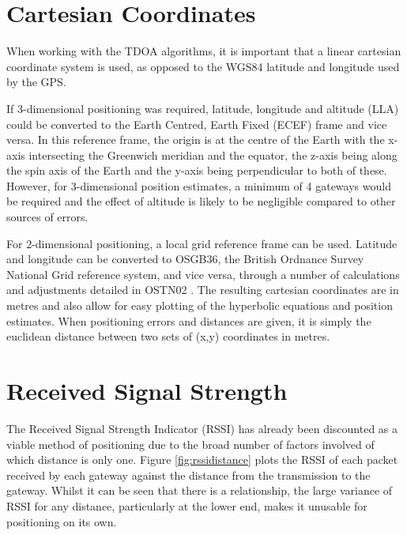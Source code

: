 \documentclass[a4paper]{report}
\begin{document}
  \section{Cartesian Coordinates}
    When working with the TDOA algorithms, it is important that a linear cartesian coordinate system is used, as opposed to the WGS84 latitude and longitude used by the GPS.

    If 3-dimensional positioning was required, latitude, longitude and altitude (LLA) could be converted to the Earth Centred, Earth Fixed (ECEF) frame and vice versa. In this reference frame, the origin is at the centre of the Earth with the x-axis intersecting the Greenwich meridian and the equator, the z-axis being along the spin axis of the Earth and the y-axis being perpendicular to both of these. However, for 3-dimensional position estimates, a minimum of 4 gateways would be required and the effect of altitude is likely to be negligible compared to other sources of errors.

    For 2-dimensional positioning, a local grid reference frame can be used. Latitude and longitude can be converted to OSGB36, the British Ordnance Survey National Grid reference system, and vice versa, through a number of calculations and adjustments detailed in OSTN02 \cite{OSTN02}. The resulting cartesian coordinates are in metres and also allow for easy plotting of the hyperbolic equations and position estimates. When positioning errors and distances are given, it is simply the euclidean distance between two sets of (x,y) coordinates in metres.

  \section{Received Signal Strength}

    The Received Signal Strength Indicator (RSSI) has already been discounted as a viable method of positioning due to the broad number of factors involved of which distance is only one. Figure \ref{fig:rssidistance} plots the RSSI of each packet received by each gateway against the distance from the transmission to the gateway. Whilst it can be seen that there is a relationship, the large variance of RSSI for any distance, particularly at the lower end, makes it unusable for positioning on its own.
\end{document}
